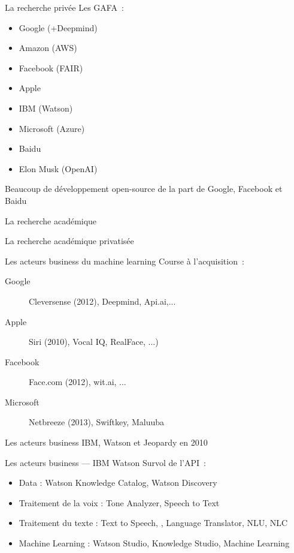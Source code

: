 \begin{frame}{La recherche privée}
  Les GAFA~:

  \begin{itemize}
  \item Google (+Deepmind)
  \item Amazon (AWS)
  \item Facebook (FAIR)
  \item Apple 
  \item IBM (Watson)
  \item Microsoft (Azure)
  \item Baidu
  \item Elon Musk (OpenAI)
  \end{itemize}

  Beaucoup de développement open-source de la part de Google, Facebook et Baidu
\end{frame}

\begin{frame}{La recherche académique}
\end{frame}

\begin{frame}{La recherche académique privatisée}
\end{frame}

\begin{frame}{Les acteurs business du machine learning}
  Course à l'acquisition~:
  \begin{description}
    \item[Google] Cleversense (2012), Deepmind, Api.ai,...
    \item[Apple] Siri (2010), Vocal IQ, RealFace, ...)
    \item[Facebook] Face.com (2012), wit.ai, ...
    \item[Microsoft] Netbreeze (2013), Swiftkey, Maluuba
    \end{description}
\end{frame}

\begin{frame}{Les acteurs business}
  IBM, Watson et Jeopardy en 2010
\end{frame}

\begin{frame}{Les acteurs business --- IBM Watson}
  Survol de l'API~:
  \begin{itemize}
    \item Data : Watson Knowledge Catalog, Watson Discovery
    \item Traitement de la voix : Tone Analyzer, Speech to Text
    \item Traitement du texte : Text to Speech, , Language Translator, NLU, NLC
    \item Machine Learning : Watson Studio, Knowledge Studio, Machine Learning
  \end{itemize}
\end{frame}

